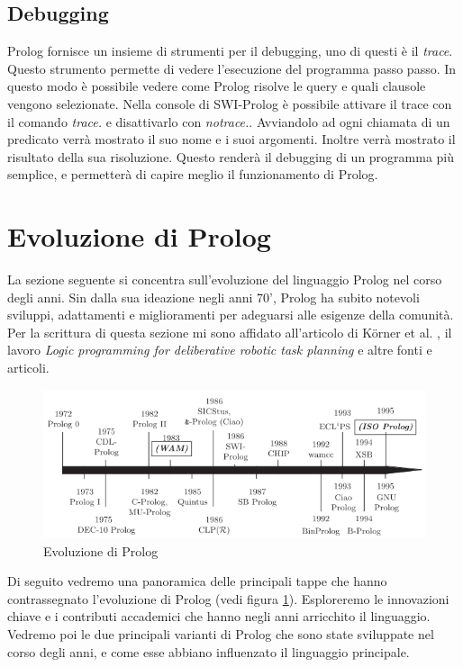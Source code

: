 \subsection{Debugging}
\label{subsec:debugging}
Prolog fornisce un insieme di strumenti per il debugging, uno di questi è il \textit{trace}. Questo strumento permette di vedere l'esecuzione del programma passo passo. 
In questo modo è possibile vedere come Prolog risolve le query e quali clausole vengono selezionate. Nella console di SWI-Prolog è possibile attivare il trace con il comando \textit{trace.} e disattivarlo con \textit{notrace.}.
Avviandolo ad ogni chiamata di un predicato verrà mostrato il suo nome e i suoi argomenti. Inoltre verrà mostrato il risultato della sua risoluzione. Questo renderà il debugging di un programma più semplice, e permetterà di capire meglio il funzionamento di Prolog.

\section{Evoluzione di Prolog}
\label{sec:evoluzione}
La sezione seguente si concentra sull'evoluzione del linguaggio Prolog nel corso degli anni. Sin dalla sua ideazione negli anni 70', Prolog ha subito notevoli sviluppi, adattamenti e miglioramenti per adeguarsi
alle esigenze della comunità. Per la scrittura di questa sezione mi sono affidato all'articolo di K\"orner et al. \cite{korner2022fifty}, il lavoro \textit{Logic programming for deliberative robotic task planning} \cite{meli2023logic} e altre fonti e articoli.
\begin{figure}[h!]
    \centering
    \includegraphics[scale=0.5]{images/prologhist.png}
    \caption{Evoluzione di Prolog \cite{korner2022fifty}}
    \label{fig:prologhist}
\end{figure}

Di seguito vedremo una panoramica delle principali tappe che hanno contrassegnato l'evoluzione di Prolog (vedi figura \ref{fig:prologhist}). Esploreremo le innovazioni chiave e i contributi accademici
che hanno negli anni arricchito il linguaggio. Vedremo poi le due principali varianti di Prolog che sono state sviluppate nel corso degli anni, e come esse abbiano influenzato il linguaggio principale.

